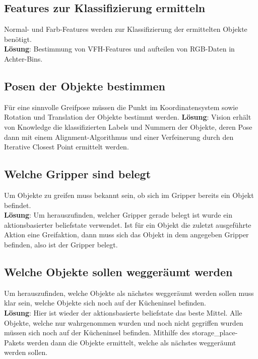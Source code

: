 \documentclass{suturo}
\begin{document}
\subsection{Features zur Klassifizierung ermitteln}
Normal- und Farb-Features werden zur Klassifizierung der ermittelten Objekte benötigt. \\
\textbf{Lösung}: Bestimmung von VFH-Features und aufteilen von RGB-Daten in Achter-Bins.

\subsection{Posen der Objekte bestimmen}
Für eine sinnvolle Greifpose müssen die Punkt im Koordinatensystem sowie Rotation und Translation der Objekte bestimmt werden. 
\textbf{Lösung}: Vision erhält von Knowledge die klassifizierten Labels und Nummern der Objekte, deren Pose dann mit einem Alignment-Algorithmus und einer Verfeinerung durch den Iterative Closest Point ermittelt werden.

\subsection{Welche Gripper sind belegt}
Um Objekte zu greifen muss bekannt sein, ob sich im Gripper bereits ein Objekt befindet.\\
\textbf{Lösung}: Um herauszufinden, welcher Gripper gerade belegt ist wurde ein aktionsbasierter beliefstate verwendet. Ist für ein Objekt die zuletzt ausgeführte Aktion eine Greifaktion, dann muss sich das Objekt in dem angegeben Gripper befinden, also ist der Gripper belegt.

\subsection{Welche Objekte sollen weggeräumt werden}
Um herauszufinden, welche Objekte als nächstes weggeräumt werden sollen muss klar sein, welche Objekte sich noch auf der Kücheninsel befinden.\\
\textbf{Lösung}: Hier ist wieder der aktionsbasierte beliefstate das beste Mittel. Alle Objekte, welche nur wahrgenommen wurden und noch nicht gegriffen wurden müssen sich noch auf der Kücheninsel befinden. Mithilfe des storage\_place- Pakets werden dann die Objekte ermittelt, welche als nächstes weggeräumt werden sollen.
\end{document}
